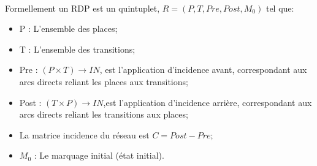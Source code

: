 \begin{definition}[Formelle]\citep{Murata1989}\\
Formellement un RDP est un quintuplet, $R= (P, T, Pre,Post , M_0 )$ tel que:
\begin{itemize}
	\item P : L'ensemble des places;
	\item T : L'ensemble des transitions;
	\item Pre : $(P  \times T)\rightarrow IN$, est l'application d'incidence avant, correspondant aux arcs directs reliant les
places aux transitions;
	\item Post : $(T  \times P)\rightarrow IN$,est l'application d'incidence arrière, correspondant aux arcs directs reliant
les transitions aux places;
	\item La matrice incidence du réseau est $C=Post-Pre$;
	\item $M_0$ : Le marquage initial (état initial). 
\end{itemize} 

\end{definition}
